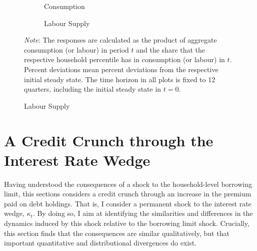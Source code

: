 \documentclass[12pt]{article} %
\numberwithin{equation}{section} %
\numberwithin{figure}{section}
\numberwithin{table}{section}
\begin{document}
\begin{figure}[ht]
    \caption{Consumption and Labour Supply Responses by Selected Percentiles}
    \label{fig:end-L-permanent-limit-percentiles}
    \centering
    \begin{subfigure}[b]{0.49\textwidth}
    \caption{Consumption}
    \label{fig:end-L-permanent-limit-percentiles-c}
         \centering
         
     \end{subfigure}
     \hfill
    \begin{subfigure}[b]{0.49\textwidth}
    \caption{Labour Supply}
    \label{fig:end-L-permanent-limit-percentiles-n}
         \centering
         
     \end{subfigure}
     
     \vspace{10pt}
     
     \justifying
     \footnotesize
	\textit{Note}: The responses are calculated as the product of aggregate consumption (or labour) in period $t$ and the share that the respective household percentile has in consumption (or labour) in $t$. Percent deviations mean percent deviations from the respective initial steady state. The time horizon in all plots is fixed to 12 quarters, including the initial steady state in $t=0$.
\end{figure}

\section{A Credit Crunch through the Interest Rate Wedge}
\label{sec:wedge}

Having understood the consequences of a shock to the household-level borrowing limit, this sections considers a credit crunch through an increase in the premium paid on debt holdings. That is, I consider a permanent shock to the interest rate wedge, $\kappa_t$. By doing so, I aim at identifying the similarities and differences in the dynamics induced by this shock relative to the borrowing limit shock. Crucially, this section finds that the consequences are similar qualitatively, but that important quantitative and distributional divergences do exist. 
\end{document}
